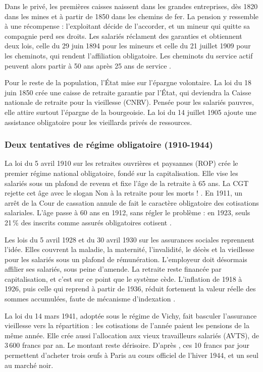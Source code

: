 Dans le privé, les premières caisses naissent dans les grandes entreprises, dès 1820 dans les mines et à partir de 1850 dans les chemins de fer. La pension y ressemble à une récompense : l'exploitant décide de l'accorder, et un mineur qui quitte sa compagnie perd ses droits. Les salariés réclament des garanties et obtiennent deux lois, celle du 29 juin 1894 pour les mineurs et celle du 21 juillet 1909 pour les cheminots, qui rendent l'affiliation obligatoire. Les cheminots du service actif peuvent alors partir à 50 ans après 25 ans de service \cite{cor2022}.

Pour le reste de la population, l'État mise sur l'épargne volontaire. La loi du 18 juin 1850 crée une caisse de retraite garantie par l'État, qui deviendra la Caisse nationale de retraite pour la vieillesse (CNRV). Pensée pour les salariés pauvres, elle attire surtout l'épargne de la bourgeoisie. La loi du 14 juillet 1905 ajoute une assistance obligatoire pour les vieillards privés de ressources.

\subsubsection{Deux tentatives de régime obligatoire (1910-1944)}

La loi du 5 avril 1910 sur les retraites ouvrières et paysannes (ROP) crée le premier régime national obligatoire, fondé sur la capitalisation. Elle vise les salariés sous un plafond de revenu et fixe l'âge de la retraite à 65 ans. La CGT rejette cet âge avec le slogan \og Non à la retraite pour les morts ! \fg{}. En 1911, un arrêt de la Cour de cassation annule de fait le caractère obligatoire des cotisations salariales. L'âge passe à 60 ans en 1912, sans régler le problème : en 1923, seuls 21\,\% des inscrits comme assurés obligatoires cotisent \cite{cor2022}.

Les lois du 5 avril 1928 et du 30 avril 1930 sur les assurances sociales reprennent l'idée. Elles couvrent la maladie, la maternité, l'invalidité, le décès et la vieillesse pour les salariés sous un plafond de rémunération. L'employeur doit désormais affilier ses salariés, sous peine d'amende. La retraite reste financée par capitalisation, et c'est sur ce point que le système cède. L'inflation de 1918 à 1926, puis celle qui reprend à partir de 1936, réduit fortement la valeur réelle des sommes accumulées, faute de mécanisme d'indexation \cite{saly2020,valat2022}.

La loi du 14 mars 1941, adoptée sous le régime de Vichy, fait basculer l'assurance vieillesse vers la répartition : les cotisations de l'année paient les pensions de la même année. Elle crée aussi l'allocation aux vieux travailleurs salariés (AVTS), de 3\,600 francs par an. Le montant reste dérisoire. D'après \cite{valat2022}, ces 10 francs par jour permettent d'acheter trois œufs à Paris au cours officiel de l'hiver 1944, et un seul au marché noir.

